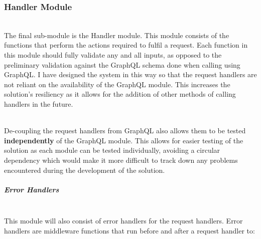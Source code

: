 \documentclass[../../main.tex]{subfiles}
\begin{document}
\subsubsection{Handler Module}

\noindent \\ The final sub-module is the Handler module. This module consists of
the functions that perform the actions required to fulfil a request.
Each function in this module should fully validate any and all inputs, as opposed
to the preliminary validation against the GraphQL schema done when calling using GraphQL.
I have designed the system in this way so that the request handlers are not reliant
on the availability of the GraphQL module. This increases the solution's resiliency
as it allows for the addition of other methods of calling handlers in the future.

\noindent \\ De-coupling the request handlers from GraphQL also allows them to be
tested \textbf{independently} of the GraphQL module. This allows for easier
testing of the solution as each module can be tested individually,  avoiding
a circular dependency which would make it more difficult to track down any problems
encountered during the development of the solution.

\subparagraph{Error Handlers\\}

\noindent \\ This module will also consist of error handlers for the request handlers.
Error handlers are middleware functions that run before and after a request handler to:
\end{document}
